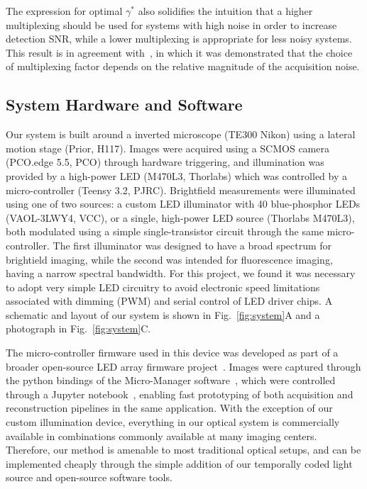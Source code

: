 The expression for optimal $\gamma^*$ also solidifies the intuition that a higher multiplexing should be used for systems with high noise in order to increase detection SNR, while a lower multiplexing is appropriate for less noisy systems. This result is in agreement with~\cite{agrawal2009optimal}, in which it was demonstrated that the choice of multiplexing factor depends on the relative magnitude of the acquisition noise. 

\subsection{System Hardware and Software} \label{Sec:hardware}
Our system is built around a inverted microscope (TE300 Nikon) using a lateral motion stage (Prior, H117). Images were acquired using a SCMOS camera (PCO.edge 5.5, PCO) through hardware triggering, and illumination was provided by a high-power LED (M470L3, Thorlabs) which was controlled by a micro-controller (Teensy 3.2, PJRC). Brightfield measurements were illuminated using one of two sources: a custom LED illuminator with 40 blue-phosphor LEDs (VAOL-3LWY4, VCC), or a single, high-power LED source (Thorlabs M470L3), both modulated using a simple single-transistor circuit through the same micro-controller. The first illuminator was designed to have a broad spectrum for brightield imaging, while the second was intended for fluorescence imaging, having a narrow spectral bandwidth. For this project, we found it was necessary to adopt very simple LED circuitry to avoid electronic speed limitations associated with dimming (PWM) and serial control of LED driver chips. A schematic and layout of our system is shown in Fig.~\ref{fig:system}A and a photograph in Fig.~\ref{fig:system}C.

The micro-controller firmware used in this device was developed as part of a broader open-source LED array firmware project~\cite{illuminate}. Images were captured through the python bindings of the Micro-Manager software~\cite{micromanager}, which were controlled through a Jupyter notebook~\cite{Kluyver:2016aa}, enabling fast prototyping of both acquisition and reconstruction pipelines in the same application. With the exception of our custom illumination device, everything in our optical system is commercially available in combinations commonly available at many imaging centers. Therefore, our method is amenable to most traditional optical setups, and can be implemented cheaply through the simple addition of our temporally coded light source and open-source software tools.

